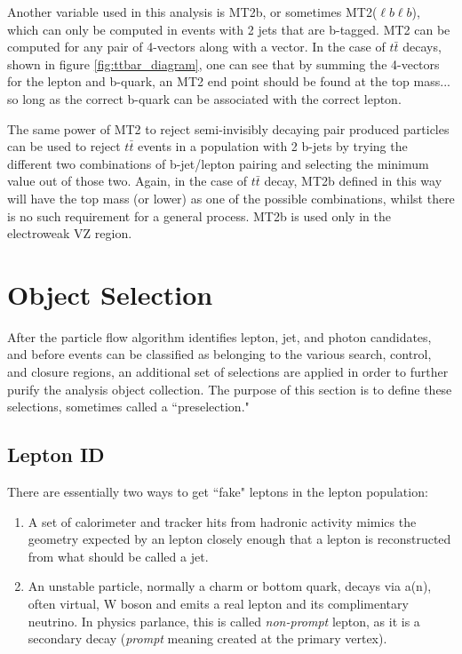       Another variable used in this analysis is MT2b, or sometimes MT2($\ell b \ell b$), which can only be computed in events with 2 jets that are b-tagged. MT2 can be computed for any pair of 4-vectors along with a \MET vector. In the case of $t\bar{t}$ decays, shown in figure \ref{fig:ttbar_diagram}, one can see that by summing the 4-vectors for the lepton and b-quark, an MT2 end point should be found at the top mass... so long as the correct b-quark can be associated with the correct lepton. 

      The same power of MT2 to reject semi-invisibly decaying pair produced particles can be used to reject $t\bar{t}$ events in a population with 2 b-jets by trying the different two combinations of b-jet/lepton pairing and selecting the minimum value out of those two. Again, in the case of $t\bar{t}$ decay, MT2b defined in this way will have the top mass (or lower) as one of the possible combinations, whilst there is no such requirement for a general process. MT2b is used only in the electroweak VZ region.

\section{Object Selection}


  After the particle flow algorithm identifies lepton, jet, and photon candidates, and before events can be classified as belonging to the various search, control, and closure regions, an additional set of selections are applied in order to further purify the analysis object collection. The purpose of this section is to define these selections, sometimes called a ``preselection."

  \subsection{Lepton ID}
    There are essentially two ways to get ``fake" leptons in the lepton population:

    \begin{enumerate}
      \item A set of calorimeter and tracker hits from hadronic activity mimics the geometry expected by an lepton closely enough that a lepton is reconstructed from what should be called a jet.
      \item An unstable particle, normally a charm or bottom quark, decays via a(n), often virtual, W boson and emits a real lepton and its complimentary neutrino. In physics parlance, this is called \emph{non-prompt} lepton, as it is a secondary decay (\emph{prompt} meaning created at the primary vertex).
    \end{enumerate}

